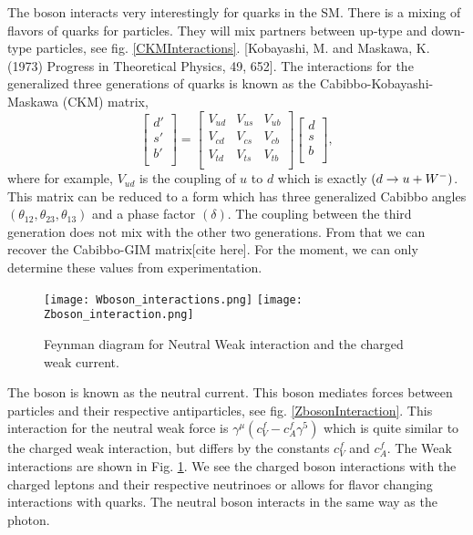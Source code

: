The \W{} boson interacts very interestingly for quarks in the SM. There is a mixing of flavors of quarks for particles. They will mix partners between up-type and down-type particles, see fig. \ref{CKMInteractions}. [Kobayashi, M. and Maskawa, K. (1973) Progress in Theoretical Physics, 49, 652]. The interactions for the generalized three generations of quarks is known as the Cabibbo-Kobayashi-Maskawa (CKM) matrix,
\begin{equation}\label{CKM}
\begin{bmatrix}
d' \\
s' \\
b' \\
\end{bmatrix} =
\begin{bmatrix}
V_{ud} & V_{us} & V_{ub} \\
V_{cd} & V_{cs} & V_{cb} \\
V_{td} & V_{ts} & V_{tb} \\
\end{bmatrix}
\begin{bmatrix}
d \\
s \\
b \\
\end{bmatrix},
\end{equation}
where for example, $V_{ud}$ is the coupling of $u$ to $d$ which is exactly $(d\rightarrow u+W^-)$. This matrix can be reduced to a form which has three generalized Cabibbo angles $(\theta_{12},\theta_{23},\theta_{13})$ and a phase factor $(\delta)$. The coupling between the third generation does not mix with the other two generations. From that we can recover the Cabibbo-GIM matrix[cite here]. For the moment, we can only determine these values from experimentation. 

\begin{figure}[!htb]
	  \texttt{[image: Wboson\_interactions.png]}
	\endminipage\hfill
	  \texttt{[image: Zboson\_interaction.png]}
	\endminipage\hfill
	\caption[Weak Feynman Diagrams]{Feynman diagram for Neutral Weak interaction and the charged weak current.}
 	\label{WeakRules} 
\end{figure}

The \Z{} boson is known as the neutral current. This boson mediates forces between particles and their respective antiparticles, see fig. \ref{ZbosonInteraction}. This interaction for the neutral weak force is $\gamma^\mu(c_V^f-c_A^f\gamma^5)$ which is quite similar to the charged weak interaction, but differs by the constants $c_V^f$ and $c_A^f$. The Weak interactions are shown in Fig. \ref{WeakRules}. We see the charged \W{} boson interactions with the charged leptons and their respective neutrinoes or allows for flavor changing interactions with quarks. The neutral \Z{} boson interacts in the same way as the photon. 

